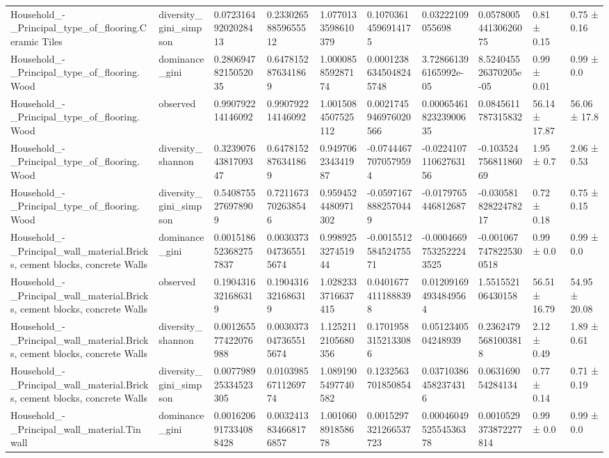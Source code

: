 \begin{longtable}{llllllllll}
Household\_-\_Principal\_type\_of\_flooring.Ceramic Tiles & diversity\_gini\_simpson & 0.07231649202028413 & 0.23302658859655512 & 1.0770133598610379 & 0.10703614596914175 & 0.03222109055698 & 0.057800544130626075 & 0.81 ± 0.15 & 0.75 ± 0.16 \\
Household\_-\_Principal\_type\_of\_flooring.Wood & dominance\_gini & 0.28069478215052035 & 0.6478152876341869 & 1.000085859287174 & 0.00012386345048245748 & 3.728661396165992e-05 & 8.524045526370205e-05 & 0.99 ± 0.01 & 0.99 ± 0.0 \\
Household\_-\_Principal\_type\_of\_flooring.Wood & observed & 0.990792214146092 & 0.990792214146092 & 1.0015084507525112 & 0.0021745946976020566 & 0.0006546182323900635 & 0.0845611787315832 & 56.14 ± 17.87 & 56.06 ± 17.8 \\
Household\_-\_Principal\_type\_of\_flooring.Wood & diversity\_shannon & 0.32390764381709347 & 0.6478152876341869 & 0.949706234341987 & -0.07444677070579594 & -0.022410711062763156 & -0.10352475681186069 & 1.95 ± 0.7 & 2.06 ± 0.53 \\
Household\_-\_Principal\_type\_of\_flooring.Wood & diversity\_gini\_simpson & 0.5408755276978909 & 0.7211673702638546 & 0.9594524480971302 & -0.05971678882570449 & -0.0179765446812687 & -0.03058182822478217 & 0.72 ± 0.18 & 0.75 ± 0.15 \\
Household\_-\_Principal\_wall\_material.Bricks, cement blocks, concrete Walls & dominance\_gini & 0.0015186523682757837 & 0.0030373047365515674 & 0.998925327451944 & -0.001551258452475571 & -0.00046697532522243525 & -0.0010677478225300518 & 0.99 ± 0.0 & 0.99 ± 0.0 \\
Household\_-\_Principal\_wall\_material.Bricks, cement blocks, concrete Walls & observed & 0.1904316321686319 & 0.1904316321686319 & 1.0282333716637415 & 0.04016774111888398 & 0.012091694934849564 & 1.551552106430158 & 56.51 ± 16.79 & 54.95 ± 20.08 \\
Household\_-\_Principal\_wall\_material.Bricks, cement blocks, concrete Walls & diversity\_shannon & 0.001265577422076988 & 0.0030373047365515674 & 1.1252112105680356 & 0.17019583152133086 & 0.0512340504248939 & 0.23624795681003818 & 2.12 ± 0.49 & 1.89 ± 0.61 \\
Household\_-\_Principal\_wall\_material.Bricks, cement blocks, concrete Walls & diversity\_gini\_simpson & 0.007798925334523305 & 0.01039856711269774 & 1.0891905497740582 & 0.1232563701850854 & 0.037103864582374316 & 0.063169054284134 & 0.77 ± 0.14 & 0.71 ± 0.19 \\
Household\_-\_Principal\_wall\_material.Tin wall & dominance\_gini & 0.0016206917334088428 & 0.0032413834668176857 & 1.001060891858678 & 0.0015297321266537723 & 0.0004604952554536378 & 0.0010529373872277814 & 0.99 ± 0.0 & 0.99 ± 0.0 \\

\end{longtable}
